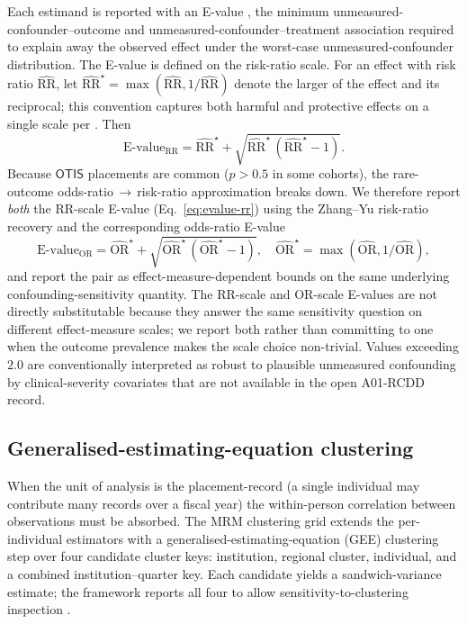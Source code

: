\documentclass[article,shortnames,nojss]{jss}
\newcommand{\OTIS}{\textsf{OTIS}}
\begin{document}
Each estimand is reported with an E-value
\citep{vanderweele2017sensitivity},
the minimum unmeasured-confounder--outcome and
unmeasured-confounder--treatment association required to explain
away the observed effect under the worst-case
unmeasured-confounder distribution.  The E-value is defined on
the risk-ratio scale.  For an effect with risk ratio
$\widehat{\mathrm{RR}}$, let
$\widehat{\mathrm{RR}}^{\star} = \max(\widehat{\mathrm{RR}},
1/\widehat{\mathrm{RR}})$ denote the larger of the effect and
its reciprocal; this convention captures both harmful and
protective effects on a single scale per
\citet{vanderweele2017sensitivity}.  Then
\begin{equation}\label{eq:evalue-rr}
\mathrm{E}{\text{-}}\mathrm{value}_{\mathrm{RR}} =
\widehat{\mathrm{RR}}^{\star} +
\sqrt{\widehat{\mathrm{RR}}^{\star}\,
(\widehat{\mathrm{RR}}^{\star} - 1)}.
\end{equation}
Because $\OTIS$ placements are common ($p > 0.5$ in some
cohorts), the rare-outcome odds-ratio$\,\to\,$risk-ratio
approximation breaks down.  We therefore report \emph{both} the
RR-scale E-value (Eq.~\ref{eq:evalue-rr}) using the Zhang--Yu
risk-ratio recovery \citep{zhang1998whats} and the
corresponding odds-ratio E-value
\begin{equation}\label{eq:evalue-or}
\mathrm{E}{\text{-}}\mathrm{value}_{\mathrm{OR}} =
\widehat{\mathrm{OR}}^{\star} +
\sqrt{\widehat{\mathrm{OR}}^{\star}\,
(\widehat{\mathrm{OR}}^{\star} - 1)},
\quad
\widehat{\mathrm{OR}}^{\star} = \max(\widehat{\mathrm{OR}},
1/\widehat{\mathrm{OR}}),
\end{equation}
and report the pair as effect-measure-dependent bounds on the
same underlying confounding-sensitivity quantity.  The
RR-scale and OR-scale E-values are not directly substitutable
because they answer the same sensitivity question on different
effect-measure scales; we report both rather than committing to
one when the outcome prevalence makes the scale choice
non-trivial.
Values exceeding $2.0$ are conventionally interpreted as robust to
plausible unmeasured confounding by clinical-severity covariates
that are not available in the open A01-RCDD record.

\subsection{Generalised-estimating-equation clustering}

When the unit of analysis is the placement-record (a single
individual may contribute many records over a fiscal year) the
within-person correlation between observations must be absorbed.
The MRM clustering grid extends the per-individual estimators with
a generalised-estimating-equation (GEE) clustering step over four
candidate cluster keys: institution, regional cluster, individual,
and a combined institution--quarter key. Each candidate yields a
sandwich-variance estimate; the framework reports all four to allow
sensitivity-to-clustering inspection \citep{Hubbard2010,
Cameron2015}.
\end{document}
